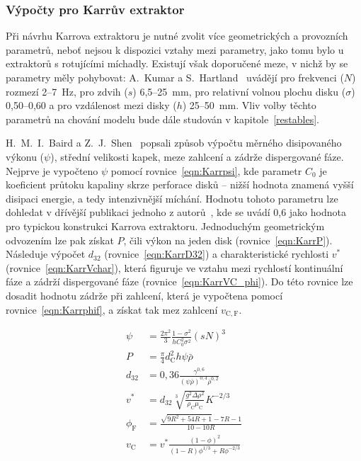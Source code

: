 \subsubsection{Výpočty pro Karrův extraktor} \label{insfunKarr}
Při návrhu Karrova extraktoru je nutné zvolit více geometrických a provozních parametrů, neboť nejsou k dispozici vztahy mezi parametry, jako tomu bylo u extraktorů s rotujícími míchadly.
Existují však doporučené meze, v nichž by se parametry měly pohybovat: A.~Kumar a S.~Hartland~\cite{Kumar1999} uvádějí pro frekvenci ($N$) rozmezí 2--7~Hz, pro zdvih ($s$) 6,5--25~mm, pro relativní volnou plochu disku ($\sigma$) 0,50--0,60 a pro vzdálenost mezi disky ($h$) 25--50~mm.
Vliv volby těchto parametrů na chování modelu bude dále studován v kapitole~\ref{restables}.

H.~M.~I.~Baird a Z.~J.~Shen~\cite{Baird1984} popsali způsob výpočtu měrného disipovaného výkonu ($\psi$), střední velikosti kapek, meze zahlcení a zádrže dispergované fáze.
Nejprve je vypočteno $\psi$ pomocí rovnice~\ref{eqn:Karrpsi}, kde parametr $C_0$ je koeficient průtoku kapaliny skrze perforace disků -- nižší hodnota znamená vyšší disipaci energie, a tedy intenzivnější míchání.
Hodnotu tohoto parametru lze dohledat v dřívější publikaci jednoho z autorů~\cite{Baird1979}, kde se uvádí 0,6 jako hodnota pro typickou konstrukci Karrova extraktoru.
Jednoduchým geometrickým odvozením lze pak získat $P$, čili výkon na jeden disk (rovnice~\ref{eqn:KarrP}).
Následuje výpočet $d_{32}$ (rovnice~\ref{eqn:KarrD32}) a charakteristické rychlosti $v^*$ (rovnice~\ref{eqn:KarrVchar}), která figuruje ve vztahu mezi rychlostí kontinuální fáze a zádrží dispergované fáze (rovnice~\ref{eqn:KarrVC_phi}).
Do této rovnice lze dosadit hodnotu zádrže při zahlcení, která je vypočtena pomocí rovnice~\ref{eqn:Karrphif}, a získat tak mez zahlcení $v_\mathrm{C,F}$.

\begin{align}
\label{eqn:Karrpsi}
	\psi &= \frac{2\pi^2}{3} \frac{ 1 - \sigma^2 }{ h C_0^2 \sigma^2 } (s N)^3 \\
\label{eqn:KarrP}
	P &= \frac{\pi}{4} d_\mathrm{C}^2 h \psi \bar{\rho} \\
\label{eqn:KarrD32}
	d_{32} &= 0,36 \frac{ \gamma^{0,6} }{ (\psi \bar{\rho})^{0,4} \bar{\rho}^{0,2} } \\
\label{eqn:KarrVchar}
	v^* &= d_{32} \sqrt[3]{ \frac{ g^2 \Delta\rho^2 }{ \rho_\mathrm{C} \mu_\mathrm{C} } } K^{-2/3} \\
\label{eqn:Karrphif}
	\phi_\mathrm{F} &= \frac{ \sqrt{9R^2 + 54R + 1} - 7R - 1 }{ 10 - 10R } \\
\label{eqn:KarrVC_phi}
	v_\mathrm{C} &= v^* \frac{ (1-\phi)^2 }{ (1-R) \phi^{1/3} + R \phi^{-2/3} }
\end{align}

